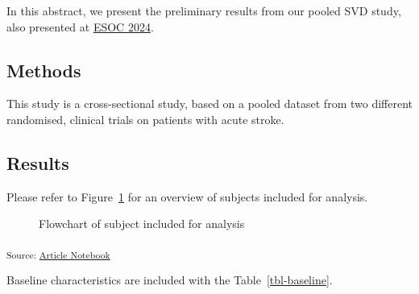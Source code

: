 \documentclass[
  letterpaper,
  DIV=11,
  numbers=noendperiod]{scrartcl}
\begin{document}
In this abstract, we present the preliminary results from our pooled SVD
study, also presented at
\href{https://apps.congrex.com/esoc2024/en-GB/pag/presentation/362937}{ESOC
2024}.

\subsection{Methods}\label{methods}

This study is a cross-sectional study, based on a pooled dataset from
two different randomised, clinical trials on patients with acute stroke.

\subsection{Results}\label{results}

Please refer to Figure~\ref{fig-flowchart} for an overview of subjects
included for analysis.

\begin{figure}


\caption{\label{fig-flowchart}Flowchart of subject included for
analysis}

\end{figure}%

\textsubscript{Source:
\href{https://agdamsbo.github.io/svd-modification/index.qmd.html}{Article
Notebook}}

Baseline characteristics are included with the Table~\ref{tbl-baseline}.
\end{document}

